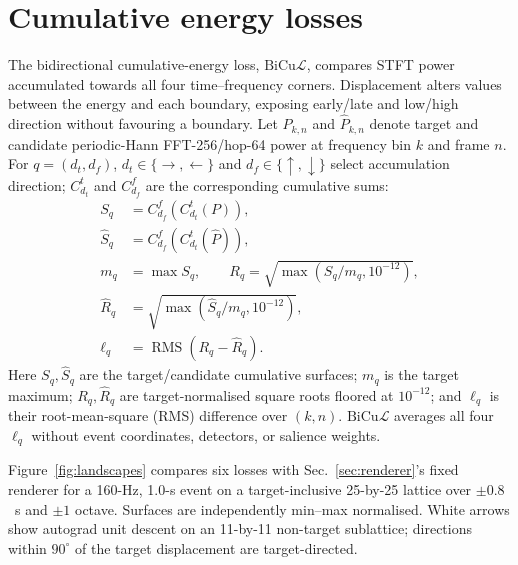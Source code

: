 \documentclass[conference]{IEEEtran}
\newcommand{\bicul}{\ensuremath{\mathrm{BiCu}\mathcal{L}}}
\begin{document}
\section{Cumulative energy losses}
\label{sec:losses}
The bidirectional cumulative-energy loss, \bicul{}, compares STFT power
accumulated towards all four time--frequency corners. Displacement alters values
between the energy and each boundary, exposing early/late and low/high direction
without favouring a boundary. Let $P_{k,n}$ and $\hat P_{k,n}$ denote target and
candidate periodic-Hann FFT-256/hop-64 power at frequency bin $k$ and frame $n$.
For $q=(d_t,d_f)$, $d_t\in\{\rightarrow,\leftarrow\}$ and
$d_f\in\{\uparrow,\downarrow\}$ select accumulation direction; $C^t_{d_t}$ and
$C^f_{d_f}$ are the corresponding cumulative sums:
\begin{equation}
\begin{aligned}
S_q&=C^f_{d_f}(C^t_{d_t}(P)),\\
\hat S_q&=C^f_{d_f}(C^t_{d_t}(\hat P)),\\
m_q&=\max S_q,\qquad R_q=\sqrt{\max(S_q/m_q,10^{-12})},\\
\hat R_q&=\sqrt{\max(\hat S_q/m_q,10^{-12})},\\
\ell_q&=\operatorname{RMS}(R_q-\hat R_q).
\end{aligned}
\end{equation}
Here $S_q,\hat S_q$ are the target/candidate cumulative surfaces; $m_q$ is the
target maximum; $R_q,\hat R_q$ are target-normalised square roots floored at
$10^{-12}$; and $\ell_q$ is their root-mean-square (RMS) difference over
$(k,n)$. \bicul{} averages all four $\ell_q$ without event coordinates,
detectors, or salience weights.

Figure~\ref{fig:landscapes} compares six losses with Sec.~\ref{sec:renderer}'s
fixed renderer for a 160-Hz, 1.0-s event on a target-inclusive 25-by-25 lattice
over $\pm0.8$~s and $\pm1$ octave. Surfaces are independently min--max
normalised. White arrows show autograd unit descent on an 11-by-11 non-target
sublattice; directions within $90^\circ$ of the target displacement are
target-directed.
\end{document}
